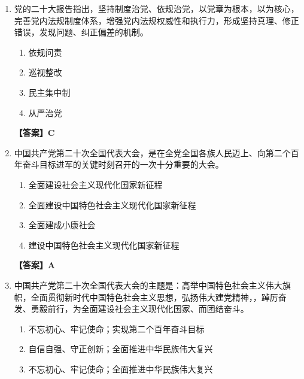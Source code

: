 \documentclass[UTF8,11pt,a4paper]{ctexart}
\begin{document}
\begin{enumerate}[label=\textbf{\arabic*.}, leftmargin=2.5em, itemsep=0.7em]
\begin{enumerate}[label=\Alph*., leftmargin=2em, itemsep=0.1em, topsep=0.15em]
\item 反腐
\item 全面从严治党
\item 改革开放
\item 全面建设社会主义现代化国家
\end{enumerate}
\textbf{【答案】B}
\item 党的二十大报告指出，坚持制度治党、依规治党，以党章为根本，以\allowbreak\underline{\hspace{4em}}为核心，完善党内法规制度体系，增强党内法规权威性和执行力，形成坚持真理、修正错误，发现问题、纠正偏差的机制。
\begin{enumerate}[label=\Alph*., leftmargin=2em, itemsep=0.1em, topsep=0.15em]
\item 依规问责
\item 巡视整改
\item 民主集中制
\item 从严治党
\end{enumerate}
\textbf{【答案】C}
\item 中国共产党第二十次全国代表大会，是在全党全国各族人民迈上\allowbreak\underline{\hspace{4em}}、向第二个百年奋斗目标进军的关键时刻召开的一次十分重要的大会。
\begin{enumerate}[label=\Alph*., leftmargin=2em, itemsep=0.1em, topsep=0.15em]
\item 全面建设社会主义现代化国家新征程
\item 全面建设中国特色社会主义现代化国家新征程
\item 全面建成小康社会
\item 建设中国特色社会主义现代化国家新征程
\end{enumerate}
\textbf{【答案】A}
\item 中国共产党第二十次全国代表大会的主题是：高举中国特色社会主义伟大旗帜，全面贯彻新时代中国特色社会主义思想，弘扬伟大建党精神，\allowbreak\underline{\hspace{4em}}，踔厉奋发、勇毅前行，为全面建设社会主义现代化国家、\allowbreak\underline{\hspace{4em}}而团结奋斗。
\begin{enumerate}[label=\Alph*., leftmargin=2em, itemsep=0.1em, topsep=0.15em]
\item 不忘初心、牢记使命；实现第二个百年奋斗目标
\item 自信自强、守正创新；全面推进中华民族伟大复兴
\item 不忘初心、牢记使命；全面推进中华民族伟大复兴

\end{enumerate}
\end{enumerate}
\end{document}
